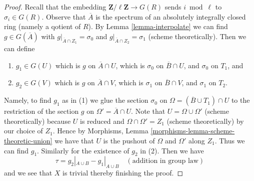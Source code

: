\begin{proof}
\medskip\noindent
Recall that the embedding $\mathbf{Z}/\ell \mathbf{Z} \to G(R)$
sends $i \bmod \ell$ to $\sigma_i \in G(R)$. Observe that $\overline{A}$
is the spectrum of an absolutely integrally closed ring (namely
a qotient of $R$). By
Lemma \ref{lemma-interpolate} we can find $g \in G(\overline{A})$ with
$g|_{\overline{A} \cap Z_1} = \sigma_0$ and
$g|_{\overline{A} \cap Z_2} = \sigma_1$ (scheme theoretically).
Then we can define
\begin{enumerate}
\item $g_1 \in G(U)$ which is $g$ on $\overline{A} \cap U$, which
is $\sigma_0$ on $\overline{B} \cap U$, and $\sigma_0$ on $T_1$, and
\item $g_2 \in G(V)$ which is $g$ on $\overline{A} \cap V$, which
is $\sigma_1$ on $\overline{B} \cap V$, and $\sigma_1$ on $T_2$.
\end{enumerate}
Namely, to find $g_1$ as in (1) we glue the section
$\sigma_0$ on $\Omega = (\overline{B} \cup T_1) \cap U$
to the restriction of the section $g$ on $\Omega' = \overline{A} \cap U$.
Note that $U = \Omega \cup \Omega'$ (scheme theoretically)
because $U$ is reduced and $\Omega \cap \Omega' = Z_1$ (scheme theoretically)
by our choice of $Z_1$. Hence by
Morphisms, Lemma \ref{morphisms-lemma-scheme-theoretic-union}
we have that $U$ is the pushout of $\Omega$ and $\Omega'$
along $Z_1$. Thus we can find $g_1$.
Similarly for the existence of $g_2$ in (2).
Then we have
$$
\tau = g_2|_{A \cup B} - g_1|_{A \cup B} \quad(\text{addition in group law})
$$
and we see that $X$ is trivial thereby finishing the proof.
\end{proof}
